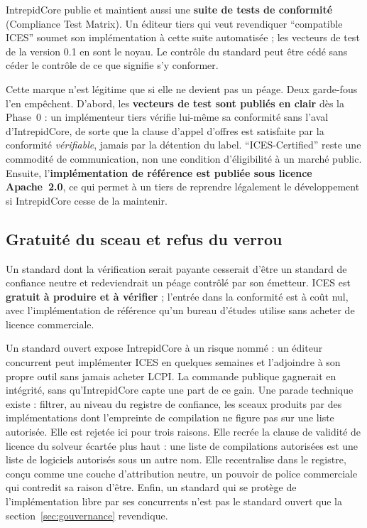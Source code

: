 \documentclass[11pt,a4paper]{article}
\begin{document}
IntrepidCore publie et maintient aussi une \textbf{suite de tests de conformité} (Compliance Test Matrix). Un éditeur tiers qui veut revendiquer \enquote{compatible ICES} soumet son implémentation à cette suite automatisée ; les vecteurs de test de la version 0.1 en sont le noyau. Le contrôle du standard peut être cédé sans céder le contrôle de ce que signifie s'y conformer.

Cette marque n'est légitime que si elle ne devient pas un péage. Deux garde-fous l'en empêchent. D'abord, les \textbf{vecteurs de test sont publiés en clair} dès la Phase~0 : un implémenteur tiers vérifie lui-même sa conformité sans l'aval d'IntrepidCore, de sorte que la clause d'appel d'offres est satisfaite par la conformité \emph{vérifiable}, jamais par la détention du label. \enquote{ICES-Certified} reste une commodité de communication, non une condition d'éligibilité à un marché public. Ensuite, l'\textbf{implémentation de référence est publiée sous licence Apache~2.0}, ce qui permet à un tiers de reprendre légalement le développement si IntrepidCore cesse de la maintenir.

\subsection{Gratuité du sceau et refus du verrou}\label{sec:gratuite}

Un standard dont la vérification serait payante cesserait d'être un standard de confiance neutre et redeviendrait un péage contrôlé par son émetteur. ICES est \textbf{gratuit à produire et à vérifier} ; l'entrée dans la conformité est à coût nul, avec l'implémentation de référence qu'un bureau d'études utilise sans acheter de licence commerciale.

Un standard ouvert expose IntrepidCore à un risque nommé : un éditeur concurrent peut implémenter ICES en quelques semaines et l'adjoindre à son propre outil sans jamais acheter LCPI. La commande publique gagnerait en intégrité, sans qu'IntrepidCore capte une part de ce gain. Une parade technique existe : filtrer, au niveau du registre de confiance, les sceaux produits par des implémentations dont l'empreinte de compilation ne figure pas sur une liste autorisée. Elle est rejetée ici pour trois raisons. Elle recrée la clause de validité de licence du solveur écartée plus haut : une liste de compilations autorisées est une liste de logiciels autorisés sous un autre nom. Elle recentralise dans le registre, conçu comme une couche d'attribution neutre, un pouvoir de police commerciale qui contredit sa raison d'être. Enfin, un standard qui se protège de l'implémentation libre par ses concurrents n'est pas le standard ouvert que la section~\ref{sec:gouvernance} revendique.
\end{document}
